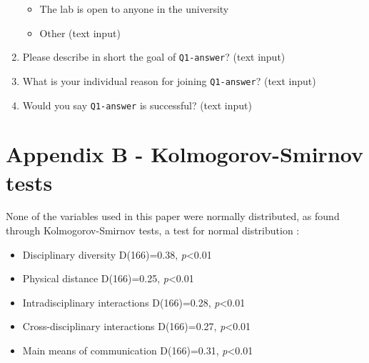 \documentclass{article}
\begin{document}
\begin{enumerate}
\begin{itemize}
        \item The lab is open to anyone in the university
        \item Other (text input)
    \end{itemize}
    \item Please describe in short the goal of \texttt{Q1-answer}? (text input)
    \item What is your individual reason for joining \texttt{Q1-answer}? (text input)
    \item Would you say \texttt{Q1-answer} is successful? (text input)
\end{enumerate}

\newpage

\section*{Appendix B - Kolmogorov-Smirnov tests}
\label{appB}
None of the variables used in this paper were normally distributed, as found through Kolmogorov-Smirnov tests, a test for normal distribution \citep[pp. 144-148]{Field2009}:

\begin{itemize}
\item Disciplinary diversity D(166)=0.38, \textit{p}\textless0.01
\item Physical distance D(166)=0.25, \textit{p}\textless0.01
\item Intradisciplinary interactions D(166)=0.28, \textit{p}\textless0.01
\item Cross-disciplinary interactions D(166)=0.27, \textit{p}\textless0.01
\item Main means of communication D(166)=0.31, \textit{p}\textless0.01
\end{itemize}
\end{document}
